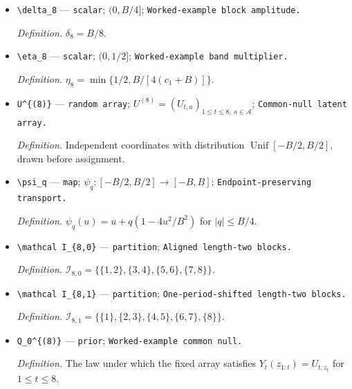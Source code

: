 \documentclass{article}
\begin{document}
\begin{itemize}
  \par\smallskip\noindent\emph{Definition.} \(c_1=C2^{-(1+\beta)}\), the lag-one envelope coefficient.
  \item \texttt{\textbackslash{}\allowbreak{}delta\_\allowbreak{}8} --- \texttt{scalar}; \((0,B/4]\); \texttt{Worked-\allowbreak{}example block amplitude.}
  \par\smallskip\noindent\emph{Definition.} \(\delta_8=B/8\).
  \item \texttt{\textbackslash{}\allowbreak{}eta\_\allowbreak{}8} --- \texttt{scalar}; \((0,1/2]\); \texttt{Worked-\allowbreak{}example band multiplier.}
  \par\smallskip\noindent\emph{Definition.} \(\eta_8=\min\{1/2,B/[4(c_1+B)]\}\).
  \item \texttt{U\textasciicircum{}\{(8)\}\allowbreak{}} --- \texttt{random array}; \(U^{(8)}=(U_{t,a})_{1\le t\le8,\ a\in\mathcal A}\); \texttt{Common-\allowbreak{}null latent array.}
  \par\smallskip\noindent\emph{Definition.} Independent coordinates with distribution \(\operatorname{Unif}[-B/2,B/2]\), drawn before assignment.
  \item \texttt{\textbackslash{}\allowbreak{}psi\_\allowbreak{}q} --- \texttt{map}; \(\psi_q:[-B/2,B/2]\to[-B,B]\); \texttt{Endpoint-\allowbreak{}preserving transport.}
  \par\smallskip\noindent\emph{Definition.} \(\psi_q(u)=u+q(1-4u^2/B^2)\) for \(\lvert q\rvert\le B/4\).
  \item \texttt{\textbackslash{}\allowbreak{}mathcal I\_\allowbreak{}\{8,\allowbreak{}0\}\allowbreak{}} --- \texttt{partition}; \texttt{Aligned length-\allowbreak{}two blocks.}
  \par\smallskip\noindent\emph{Definition.} \(\mathcal I_{8,0}=\{\{1,2\},\{3,4\},\{5,6\},\{7,8\}\}\).
  \item \texttt{\textbackslash{}\allowbreak{}mathcal I\_\allowbreak{}\{8,\allowbreak{}1\}\allowbreak{}} --- \texttt{partition}; \texttt{One-\allowbreak{}period-\allowbreak{}shifted length-\allowbreak{}two blocks.}
  \par\smallskip\noindent\emph{Definition.} \(\mathcal I_{8,1}=\{\{1\},\{2,3\},\{4,5\},\{6,7\},\{8\}\}\).
  \item \texttt{Q\_\allowbreak{}0\textasciicircum{}\{(8)\}\allowbreak{}} --- \texttt{prior}; \texttt{Worked-\allowbreak{}example common null.}
  \par\smallskip\noindent\emph{Definition.} The law under which the fixed array satisfies \(Y_t(z_{1:t})=U_{t,z_t}\) for \(1\le t\le8\).

\end{itemize}
\end{document}
